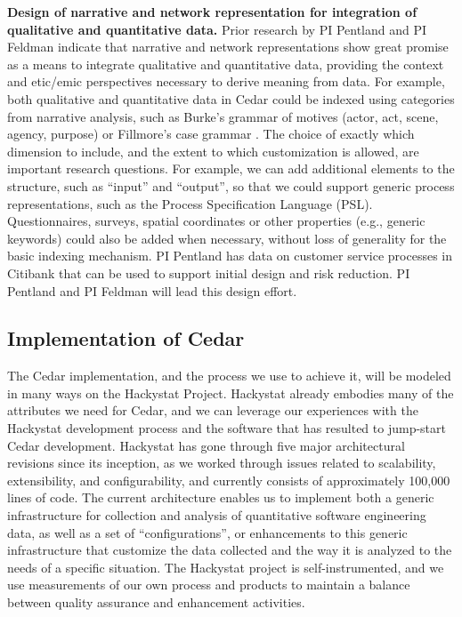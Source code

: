 {\bf Design of narrative and network representation for integration of
qualitative and quantitative data.}  Prior research by PI Pentland and PI
Feldman indicate that narrative and network representations show great
promise as a means to integrate qualitative and quantitative data,
providing the context and etic/emic perspectives necessary to derive
meaning from data.  For example, both qualitative and quantitative data in
Cedar could be indexed using categories from narrative analysis, such as
Burke's grammar of motives (actor, act, scene, agency, purpose) or
Fillmore's case grammar \cite{Burke69,Fillmore68}. The choice of exactly
which dimension to include, and the extent to which customization is
allowed, are important research questions.  For example, we can add
additional elements to the structure, such as ``input'' and ``output'', so
that we could support generic process representations, such as the Process
Specification Language (PSL).  Questionnaires, surveys, spatial coordinates
or other properties (e.g., generic keywords) could also be added when
necessary, without loss of generality for the basic indexing mechanism.  PI
Pentland has data on customer service processes in Citibank that can be
used to support initial design and risk reduction.  PI Pentland and PI
Feldman will lead this design effort.

\subsection{Implementation of Cedar}

The Cedar implementation, and the process we use to achieve it, will be
modeled in many ways on the Hackystat Project.  Hackystat already embodies
many of the attributes we need for Cedar, and we can leverage our
experiences with the Hackystat development process and the software that
has resulted to jump-start Cedar development.  Hackystat has gone through
five major architectural revisions since its inception, as we worked
through issues related to scalability, extensibility, and configurability,
and currently consists of approximately 100,000 lines of code.  The current
architecture enables us to implement both a generic infrastructure for
collection and analysis of quantitative software engineering data, as well
as a set of ``configurations'', or enhancements to this generic
infrastructure that customize the data collected and the way it is analyzed
to the needs of a specific situation.  The Hackystat project is
self-instrumented, and we use measurements of our own process and products
to maintain a balance between quality assurance and enhancement activities.

